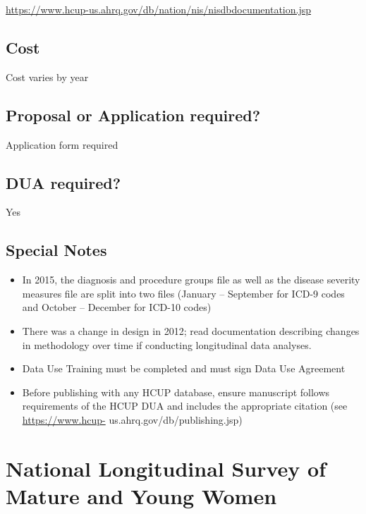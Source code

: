 \documentclass[
]{book}
\providecommand{\tightlist}{%
  \setlength{\itemsep}{0pt}\setlength{\parskip}{0pt}}
\begin{document}
\url{https://www.hcup-us.ahrq.gov/db/nation/nis/nisdbdocumentation.jsp}

\hypertarget{cost-55}{%
\section{Cost}\label{cost-55}}

Cost varies by year

\hypertarget{proposal-or-application-required-55}{%
\section{Proposal or Application required?}\label{proposal-or-application-required-55}}

Application form required

\hypertarget{dua-required-55}{%
\section{DUA required?}\label{dua-required-55}}

Yes

\hypertarget{special-notes-55}{%
\section{Special Notes}\label{special-notes-55}}

\begin{itemize}
\tightlist
\item
  In 2015, the diagnosis and procedure groups file as well as the disease severity measures file are split into two files (January -- September for ICD-9 codes and October -- December for ICD-10 codes)
\item
  There was a change in design in 2012; read documentation describing changes in methodology over time if conducting longitudinal data analyses.
\item
  Data Use Training must be completed and must sign Data Use Agreement
\item
  Before publishing with any HCUP database, ensure manuscript follows requirements of the HCUP DUA and includes the appropriate citation (see \url{https://www.hcup-} us.ahrq.gov/db/publishing.jsp)
\end{itemize}

\mainmatter

\hypertarget{national-longitudinal-survey-of-mature-and-young-women}{%
\chapter{National Longitudinal Survey of Mature and Young Women}\label{national-longitudinal-survey-of-mature-and-young-women}}
\end{document}
